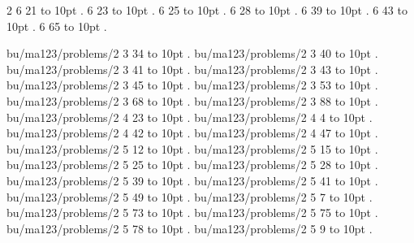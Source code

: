 2 6 21 \leaders\hbox to 10pt {\hss.\hss}  \hfill {}
 6 23 \leaders\hbox to 10pt {\hss.\hss}  \hfill {}
 6 25 \leaders\hbox to 10pt {\hss.\hss}  \hfill {}
 6 28 \leaders\hbox to 10pt {\hss.\hss}  \hfill {}
 6 39 \leaders\hbox to 10pt {\hss.\hss}  \hfill {}
 6 43 \leaders\hbox to 10pt {\hss.\hss}  \hfill {}
 6 65 \leaders\hbox to 10pt {\hss.\hss}  \hfill {}
\smallskip
\par\endgroup
\bigskip
bu/ma123/problems/2 3 34 \leaders\hbox to 10pt {\hss.\hss}  \hfill {}
\smallskip
bu/ma123/problems/2 3 40 \leaders\hbox to 10pt {\hss.\hss}  \hfill {}
\smallskip
bu/ma123/problems/2 3 41 \leaders\hbox to 10pt {\hss.\hss}  \hfill {}
\smallskip
bu/ma123/problems/2 3 43 \leaders\hbox to 10pt {\hss.\hss}  \hfill {}
\smallskip
bu/ma123/problems/2 3 45 \leaders\hbox to 10pt {\hss.\hss}  \hfill {}
\smallskip
bu/ma123/problems/2 3 53 \leaders\hbox to 10pt {\hss.\hss}  \hfill {}
\smallskip
bu/ma123/problems/2 3 68 \leaders\hbox to 10pt {\hss.\hss}  \hfill {}
\smallskip
bu/ma123/problems/2 3 88 \leaders\hbox to 10pt {\hss.\hss}  \hfill {}
\smallskip
bu/ma123/problems/2 4 23 \leaders\hbox to 10pt {\hss.\hss}  \hfill {}
\smallskip
bu/ma123/problems/2 4 4 \leaders\hbox to 10pt {\hss.\hss}  \hfill {}
\smallskip
bu/ma123/problems/2 4 42 \leaders\hbox to 10pt {\hss.\hss}  \hfill {}
\smallskip
bu/ma123/problems/2 4 47 \leaders\hbox to 10pt {\hss.\hss}  \hfill {}
\smallskip
bu/ma123/problems/2 5 12 \leaders\hbox to 10pt {\hss.\hss}  \hfill {}
\smallskip
bu/ma123/problems/2 5 15 \leaders\hbox to 10pt {\hss.\hss}  \hfill {}
\smallskip
bu/ma123/problems/2 5 25 \leaders\hbox to 10pt {\hss.\hss}  \hfill {}
\smallskip
bu/ma123/problems/2 5 28 \leaders\hbox to 10pt {\hss.\hss}  \hfill {}
\smallskip
bu/ma123/problems/2 5 39 \leaders\hbox to 10pt {\hss.\hss}  \hfill {}
\smallskip
bu/ma123/problems/2 5 41 \leaders\hbox to 10pt {\hss.\hss}  \hfill {}
\smallskip
bu/ma123/problems/2 5 49 \leaders\hbox to 10pt {\hss.\hss}  \hfill {}
\smallskip
bu/ma123/problems/2 5 7 \leaders\hbox to 10pt {\hss.\hss}  \hfill {}
\smallskip
bu/ma123/problems/2 5 73 \leaders\hbox to 10pt {\hss.\hss}  \hfill {}
\smallskip
bu/ma123/problems/2 5 75 \leaders\hbox to 10pt {\hss.\hss}  \hfill {}
\smallskip
bu/ma123/problems/2 5 78 \leaders\hbox to 10pt {\hss.\hss}  \hfill {}
\smallskip
bu/ma123/problems/2 5 9 \leaders\hbox to 10pt {\hss.\hss}  \hfill {}
